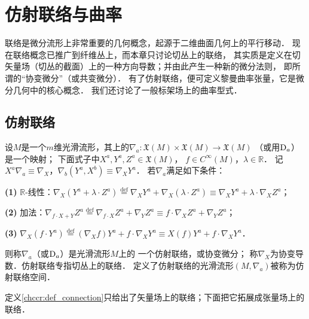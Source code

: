 
\chapter{仿射联络与曲率}\label{chccr}
联络是微分流形上非常重要的几何概念，起源于二维曲面几何上的平行移动．
现在联络概念已推广到纤维丛上，而本章只讨论切丛上的联络，
其实质是定义在切矢量场（切丛的截面）上的一种方向导数；并由此产生一种新的微分法则，
即所谓的“协变微分”（或共变微分）．
有了仿射联络，便可定义黎曼曲率张量，它是微分几何中的核心概念．
我们还讨论了一般标架场上的曲率型式．



\section{仿射联络}\label{chccr:sec_affine-connection}

\begin{definition}\label{chccr:def_connection}
    设$M$是一个$m$维光滑流形，其上的$\nabla_a:\mathfrak{X}(M)\times \mathfrak{X}(M)\to \mathfrak{X}(M)$
    （或用${\rm D}_a$）是一个映射；
    下面式子中$ X^a, Y^a, Z^a\in \mathfrak{X}(M)$，
    $ f\in C^\infty(M)$，$ \lambda \in \mathbb{R}$．
    记$X^a\nabla_a \equiv \nabla_X $，$\nabla_b (Y^a,X^b) \equiv \nabla_X Y^a$．
    若$\nabla_a$满足如下条件：

    {\bfseries (1)}  $\mathbb{R}$-线性：$\nabla_X (Y^a +\lambda\cdot Z^a)
       \overset{\mathrm {def}}{=}\nabla_X Y^a +\nabla_X (\lambda\cdot Z^a) \equiv  \nabla_X Y^a +\lambda\cdot\nabla_X Z^a$；

    {\bfseries (2)} 加法：$\nabla_{f\cdot X+Y} Z^a 
    \overset{\mathrm {def}}{=} \nabla_{f\cdot X} Z^a + \nabla_{Y} Z^a
    \equiv f \cdot \nabla_{X} Z^a + \nabla_{Y} Z^a $；

    {\bfseries (3)} $\nabla_{X} (f\cdot Y^a) \overset{\mathrm {def}}{=} (\nabla_{X} f) Y^a + f\cdot \nabla_{X} Y^a
     \equiv X(f) Y^a + f\cdot \nabla_{X} Y^a$．

    则称$\nabla_a$（或${\rm D}_a$）是光滑流形$M$上的
    一个{\heiti 仿射联络}，或{\heiti 协变微分}；
    称$\nabla_X$为{\heiti 协变导数}．仿射联络专指切丛上的联络．
    定义了仿射联络的光滑流形$(M,\nabla_a)$被称为{\heiti 仿射联络空间}．
\end{definition}


定义\ref{chccr:def_connection}只给出了矢量场上的联络；下面把它拓展成张量场上的联络．

